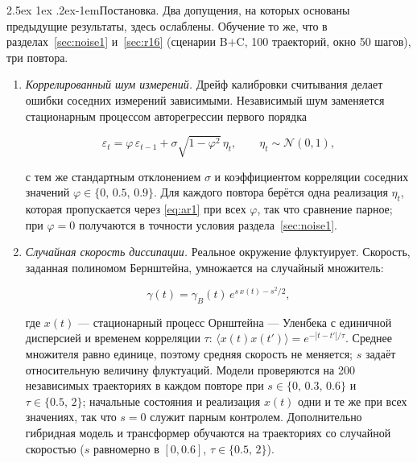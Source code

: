 \documentclass[12pt,a4paper]{report}
\makeatletter
\renewcommand\paragraph{\@startsection{paragraph}{4}{\z@}%
  {2.5ex \@plus1ex \@minus.2ex}{-1em}{\normalfont\normalsize\bfseries}}
\numberwithin{equation}{chapter}
\makeatother
\begin{document}
\paragraph{Постановка.} Два допущения, на которых основаны предыдущие
результаты, здесь ослаблены. Обучение то же, что в
разделах~\ref{sec:noise1} и~\ref{sec:r16} (сценарии B$+$C, 100 траекторий,
окно 50 шагов), три повтора.
\begin{enumerate}
\item \emph{Коррелированный шум измерений.} Дрейф калибровки считывания
      делает ошибки соседних измерений зависимыми. Независимый шум
      заменяется стационарным процессом авторегрессии первого порядка
      \begin{keybox}
      \begin{equation}
      \varepsilon_t=\varphi\,\varepsilon_{t-1}+\sigma\sqrt{1-\varphi^2}\,\eta_t,
      \qquad \eta_t\sim\mathcal N(0,1),
      \label{eq:ar1}
      \end{equation}
      \end{keybox}
      с тем же стандартным отклонением $\sigma$ и коэффициентом корреляции
      соседних значений $\varphi\in\{0,\,0.5,\,0.9\}$. Для каждого повтора
      берётся одна реализация $\eta_t$, которая пропускается через
      \eqref{eq:ar1} при всех $\varphi$, так что сравнение парное; при
      $\varphi=0$ получаются в точности условия
      раздела~\ref{sec:noise1}.
\item \emph{Случайная скорость диссипации.} Реальное окружение
      флуктуирует. Скорость, заданная полиномом Бернштейна, умножается на
      случайный множитель:
      \begin{keybox}
      \begin{equation}
      \gamma(t)=\gamma_B(t)\,e^{s\,x(t)-s^2/2},
      \label{eq:ou}
      \end{equation}
      \end{keybox}
      где $x(t)$ --- стационарный процесс Орнштейна --- Уленбека с единичной
      дисперсией и временем корреляции $\tau$:
      $\langle x(t)x(t')\rangle=e^{-|t-t'|/\tau}$. Среднее множителя равно
      единице, поэтому средняя скорость не меняется; $s$ задаёт
      относительную величину флуктуаций. Модели проверяются на 200
      независимых траекториях в каждом повторе при $s\in\{0,\,0.3,\,0.6\}$
      и $\tau\in\{0.5,\,2\}$; начальные состояния и реализация $x(t)$ одни
      и те же при всех значениях, так что $s=0$ служит парным контролем.
      Дополнительно гибридная модель и трансформер обучаются на
      траекториях со случайной скоростью ($s$ равномерно в $[0,0.6]$,
      $\tau\in\{0.5,\,2\}$).
\end{enumerate}
\end{document}
